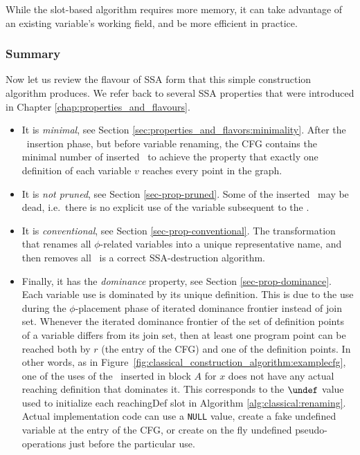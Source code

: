 While the slot-based algorithm requires more memory, it can take advantage of an existing variable's working field, and be more efficient in practice. 

\subsubsection*{Summary}

Now let us review the flavour of SSA form that this simple
construction algorithm produces. We refer back to several
SSA properties that were introduced in
Chapter \ref{chap:properties_and_flavours}.

\begin{itemize}
\item It is \textit{minimal}, see Section \ref{sec:properties_and_flavors:minimality}.
After the \phifun\ insertion phase,
but before variable renaming, the CFG contains the minimal 
number of inserted \phifuns\ to achieve the property that exactly
one definition of each variable $v$ reaches every point in the graph.
\item It is \textit{not pruned}, see Section \ref{sec-prop-pruned}.
Some of the inserted \phifuns\
may be dead, i.e.\ there is no explicit use of the variable subsequent
to the \phifun.
\item It is \textit{conventional}, see Section \ref{sec-prop-conventional}.
The transformation that renames all $\phi$-related variables into a
unique representative name, and then removes all \phifuns\ is a correct SSA-destruction algorithm.
\item Finally, it has the \textit{dominance} property, see Section
\ref{sec-prop-dominance}.
Each variable use is dominated by its unique definition. This is due
to the use during the $\phi$-placement phase of iterated dominance
frontier instead of join set. Whenever the iterated dominance frontier
of the set of definition points of a variable differs from its join
set, then at least one program point can be reached both by $r$ (the
entry of the CFG) and one of the definition points. In other words, as
in Figure~\ref{fig:classical_construction_algorithm:examplecfg}, one
of the uses of the \phifun\ inserted in block $A$ for $x$ does not have
any actual reaching definition that dominates it. This corresponds to
the $\undef$ value used to initialize each reachingDef slot in Algorithm
\ref{alg:classical:renaming}.
Actual implementation code can use a \texttt{NULL} value, create a
fake undefined variable at the entry of the CFG, or create on the fly
undefined pseudo-operations just before the particular use.
\end{itemize}



